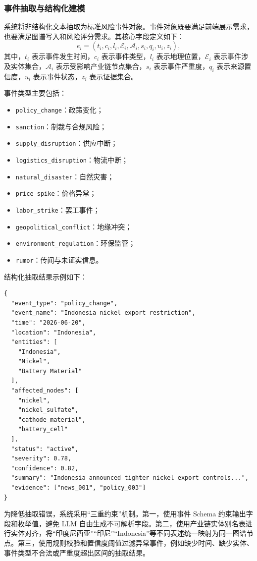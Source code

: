 \documentclass[12pt,a4paper]{article}
\begin{document}
\subsubsection{事件抽取与结构化建模}

系统将非结构化文本抽取为标准风险事件对象。事件对象既要满足前端展示需求，也要满足图谱写入和风险评分需求。其核心字段定义如下：
\begin{equation}
e_i =
\left(
t_i, c_i, l_i, \mathcal{E}_i, \mathcal{A}_i, s_i, q_i, u_i, z_i
\right),
\end{equation}
其中，$t_i$ 表示事件发生时间，$c_i$ 表示事件类型，$l_i$ 表示地理位置，$\mathcal{E}_i$ 表示事件涉及实体集合，$\mathcal{A}_i$ 表示受影响产业链节点集合，$s_i$ 表示事件严重度，$q_i$ 表示来源置信度，$u_i$ 表示事件状态，$z_i$ 表示证据集合。

事件类型主要包括：
\begin{itemize}
    \item \texttt{policy\_change}：政策变化；
    \item \texttt{sanction}：制裁与合规风险；
    \item \texttt{supply\_disruption}：供应中断；
    \item \texttt{logistics\_disruption}：物流中断；
    \item \texttt{natural\_disaster}：自然灾害；
    \item \texttt{price\_spike}：价格异常；
    \item \texttt{labor\_strike}：罢工事件；
    \item \texttt{geopolitical\_conflict}：地缘冲突；
    \item \texttt{environment\_regulation}：环保监管；
    \item \texttt{rumor}：传闻与未证实信息。
\end{itemize}

结构化抽取结果示例如下：
\begin{verbatim}
{
  "event_type": "policy_change",
  "event_name": "Indonesia nickel export restriction",
  "time": "2026-06-20",
  "location": "Indonesia",
  "entities": [
    "Indonesia", 
    "Nickel", 
    "Battery Material"
  ],
  "affected_nodes": [
    "nickel", 
    "nickel_sulfate", 
    "cathode_material", 
    "battery_cell"
  ],
  "status": "active",
  "severity": 0.78,
  "confidence": 0.82,
  "summary": "Indonesia announced tighter nickel export controls...",
  "evidence": ["news_001", "policy_003"]
}
\end{verbatim}

为降低抽取错误，系统采用“三重约束”机制。第一，使用事件 Schema 约束输出字段和枚举值，避免 LLM 自由生成不可解析字段。第二，使用产业链实体别名表进行实体对齐，将“印度尼西亚”“印尼”“Indonesia”等不同表述统一映射为同一图谱节点。第三，使用规则校验和置信度阈值过滤异常事件，例如缺少时间、缺少实体、事件类型不合法或严重度超出区间的抽取结果。
\end{document}
